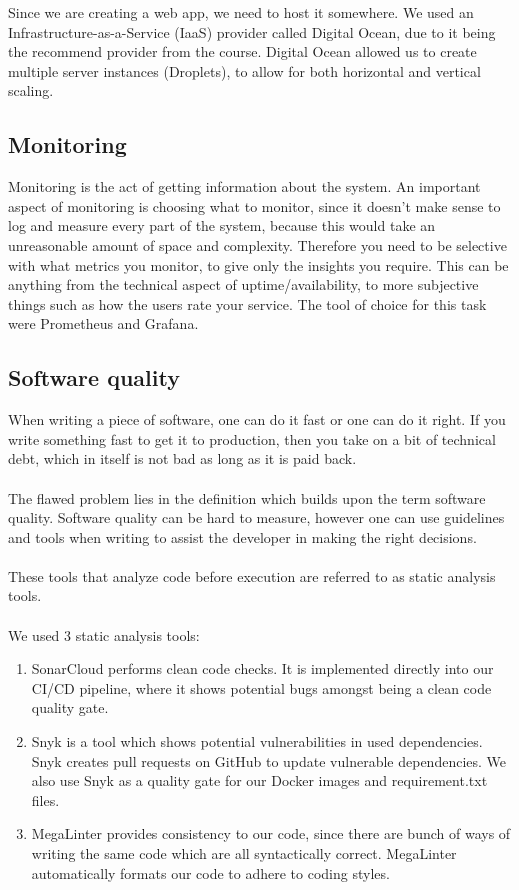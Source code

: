 Since we are creating a web app, we need to host it somewhere. We used an Infrastructure-as-a-Service (IaaS) provider called Digital Ocean, due to it being the recommend provider from the course. Digital Ocean allowed us to create multiple server instances (Droplets), to allow for both horizontal and vertical scaling.

\subsection*{Monitoring}

Monitoring is the act of getting information about the system. An important aspect of monitoring is choosing what to monitor, since it doesn't make sense to log and measure every part of the system, because this would take an unreasonable amount of space and complexity. Therefore you need to be selective with what metrics you monitor, to give only the insights you require. This can be anything from the technical aspect of uptime/availability, to more subjective things such as how the users rate your service. The tool of choice for this task were Prometheus and Grafana.

\subsection*{Software quality}

When writing a piece of software, one can do it fast or one can do it right. If you write something fast to get it to production, then you take on a bit of technical debt, which in itself is not bad as long as it is paid back.
\\\\
The flawed problem lies in the definition which builds upon the term software quality. Software quality can be hard to measure, however one can use guidelines and tools when writing to assist the developer in making the right decisions.
\\\\
These tools that analyze code before execution are referred to as static analysis tools.
\\\\
We used 3 static analysis tools:
\begin{enumerate}
    \item SonarCloud performs clean code checks. It is implemented directly into our CI/CD pipeline, where it shows potential bugs amongst being a clean code quality gate.
    \item Snyk is a tool which shows potential vulnerabilities in used dependencies. Snyk creates pull requests on GitHub to update vulnerable dependencies. We also use Snyk as a quality gate for our Docker images and requirement.txt files.
    \item MegaLinter provides consistency to our code, since there are bunch of ways of writing the same code which are all syntactically correct. MegaLinter automatically formats our code to adhere to coding styles.
\end{enumerate}

